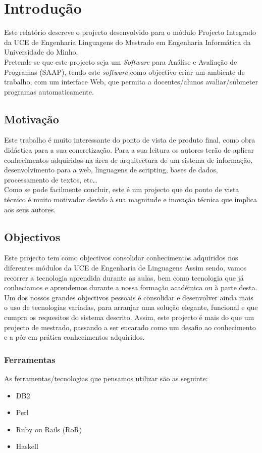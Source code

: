 \chapter{Introdução} \label{chap int}
Este relatório descreve o projecto desenvolvido para o módulo Projecto Integrado da UCE de Engenharia Linguagens do Mestrado em Engenharia Informática da Universidade do Minho.\\

Pretende-se que este projecto seja um \emph{Software} para Análise e Avaliação de Programas (SAAP), tendo este \emph{software} como objectivo criar um 
ambiente de trabalho, com um interface Web, que permita a docentes/alunos avaliar/submeter programas automaticamente.

\section{Motivação}
Este trabalho é muito interessante do ponto de vista de produto final, como obra didáctica para a sua concretização. Para a sua leitura os autores terão de aplicar
conhecimentos adquiridos na área de arquitectura de um sistema de informação, desenvolvimento para a web, linguagens de scripting, bases de dados, processamento de textos, etc\ldots\\
Como se pode facilmente concluir, este é um projecto que do ponto de vista técnico é muito motivador devido à sua magnitude e inovação técnica que implica aos seus autores.

\section{Objectivos}
Este projecto tem como objectivos consolidar conhecimentos adquiridos nos diferentes módulos da UCE de Engenharia de Linguagens
Assim sendo, vamos recorrer a tecnologia aprendida durante as aulas, bem como tecnologia que já conheciamos e aprendemos durante a nossa formação académica ou à parte desta.
Um dos nossos grandes objectivos pessoais é consolidar e desenvolver ainda mais o uso de tecnologias variadas, para arranjar uma solução elegante, funcional e que cumpra os requesitos do sistema descrito.
Assim, este projecto é mais do que um projecto de mestrado, passando a ser encarado como um desafio ao conhecimento e a pôr em prática conhecimentos adquiridos.

\subsection{Ferramentas}
As ferramentas/tecnologias que pensamos utilizar são as seguinte:
\begin{itemize}
\item DB2
\item Perl
\item Ruby on Rails (RoR)
\item Haskell
\end{itemize}

